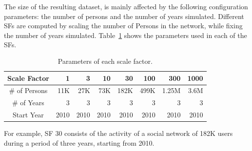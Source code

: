 The size of the resulting dataset, is mainly affected by the following
configuration parameters: the number of persons and the number of years
simulated. Different SFs are computed by scaling the number of Persons in
the network, while fixing the number of years simulated.
Table~\ref{tab:snsize} shows the parameters used in each of the SFs.

\begin{table}[H]
\centering
\begin{tabular}{|c||r|r|r|r|r|r|r|}
\hline  Scale Factor  & 1 &  3 & 10 & 30 & 100 & 300 & 1000 \\
\hline  \# of Persons  & 11K &  27K & 73K & 182K & 499K & 1.25M & 3.6M \\
\hline  \# of Years  & 3 &  3 & 3 & 3 & 3 & 3 & 3 \\
\hline  Start Year & 2010 &  2010 & 2010 & 2010 & 2010 & 2010 & 2010 \\
\hline
\end{tabular}
\centering
\caption{Parameters of each scale factor.}
\label{tab:snsize}
\end{table}

For example, SF 30 consists of the activity of a social network of 182K users
during a period of three years, starting from 2010.


